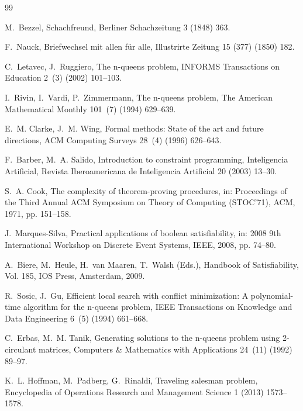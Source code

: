 \documentclass[a4paper,fleqn]{cas-sc}
\begin{document}
\begin{thebibliography}{99}

M.~Bezzel, Schachfreund, Berliner Schachzeitung 3 (1848) 363.

F.~Nauck, Briefwechsel mit allen f{\"u}r alle, Illustrirte Zeitung 15 (377) (1850) 182.

C.~Letavec, J.~Ruggiero, The n-queens problem, INFORMS Transactions on Education 2~(3) (2002) 101--103.

I.~Rivin, I.~Vardi, P.~Zimmermann, The n-queens problem, The American Mathematical Monthly 101~(7) (1994) 629--639.

E.~M. Clarke, J.~M. Wing, Formal methods: State of the art and future directions, ACM Computing Surveys 28~(4) (1996) 626--643.

F.~Barber, M.~A. Salido, Introduction to constraint programming, Inteligencia Artificial, Revista Iberoamericana de Inteligencia Artificial 20 (2003) 13--30.

S.~A. Cook, The complexity of theorem-proving procedures, in: Proceedings of the Third Annual ACM Symposium on Theory of Computing (STOC'71), ACM, 1971, pp. 151--158.

J.~Marques-Silva, Practical applications of boolean satisfiability, in: 2008 9th International Workshop on Discrete Event Systems, IEEE, 2008, pp. 74--80.

A.~Biere, M.~Heule, H.~van Maaren, T.~Walsh (Eds.), Handbook of Satisfiability, Vol. 185, IOS Press, Amsterdam, 2009.

R.~Sosic, J.~Gu, Efficient local search with conflict minimization: A polynomial-time algorithm for the n-queens problem, IEEE Transactions on Knowledge and Data Engineering 6~(5) (1994) 661--668.

C.~Erbas, M.~M. Tanik, Generating solutions to the n-queens problem using 2-circulant matrices, Computers \& Mathematics with Applications 24~(11) (1992) 89--97.

K.~L. Hoffman, M.~Padberg, G.~Rinaldi, Traveling salesman problem, Encyclopedia of Operations Research and Management Science 1 (2013) 1573--1578.


\end{thebibliography}
\end{document}
